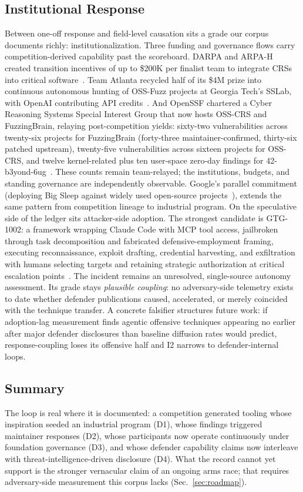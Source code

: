 \documentclass[conference,compsoc]{IEEEtran}
\begin{document}
\subsection{Institutional Response}
Between one-off response and field-level causation sits a grade our corpus documents richly:
institutionalization. Three funding and governance flows carry competition-derived capability
past the scoreboard. DARPA and ARPA-H created transition incentives of up to \$200K per finalist team to integrate CRSs
into critical software~\cite{darparesults2025}. Team Atlanta recycled half of its \$4M prize
into continuous autonomous hunting of OSS-Fuzz projects at Georgia Tech's SSLab, with OpenAI
contributing API credits~\cite{taafc2025}. And OpenSSF chartered a Cyber Reasoning Systems
Special Interest Group that now hosts OSS-CRS and FuzzingBrain, relaying post-competition
yields: sixty-two vulnerabilities across twenty-six projects for FuzzingBrain
(forty-three maintainer-confirmed, thirty-six patched upstream), twenty-five vulnerabilities
across sixteen projects for OSS-CRS, and twelve kernel-related plus ten user-space zero-day
findings for 42-b3yond-6ug~\cite{openssfaixcc2026}. These counts remain team-relayed; the
institutions, budgets, and standing governance are independently observable. Google's parallel
commitment (deploying Big Sleep against widely used open-source projects~\cite{bloggoogle2025}), 
extends the same pattern from competition lineage to industrial program.
On the speculative side of the ledger sits attacker-side adoption. The strongest candidate is
GTG-1002: a framework wrapping Claude Code with MCP tool access, jailbroken through task
decomposition and fabricated defensive-employment framing, executing reconnaissance,
exploit drafting, credential harvesting, and exfiltration with humans selecting targets and
retaining strategic authorization at critical escalation points~\cite{anthropicgtg2025,anthropicgtgreport2025}. The
incident remains an unresolved, single-source autonomy assessment. Its
grade stays \emph{plausible coupling}: no adversary-side telemetry exists to date whether
defender publications caused, accelerated, or merely coincided with the technique transfer.
A concrete falsifier structures future work: if adoption-lag measurement finds agentic
offensive techniques appearing no earlier after major defender disclosures than baseline
diffusion rates would predict, response-coupling loses its offensive half and I2 narrows to
defender-internal loops.

\subsection{Summary}
The loop is real where it is documented: a competition generated tooling whose inspiration
seeded an industrial program (D1), whose findings triggered maintainer responses (D2), whose
participants now operate continuously under foundation governance (D3), and whose defender
capability claims now interleave with threat-intelligence-driven disclosure (D4). What the
record cannot yet support is the stronger vernacular claim of an ongoing arms race; that
requires adversary-side measurement this corpus lacks (Sec.~\ref{sec:roadmap}).
\end{document}
